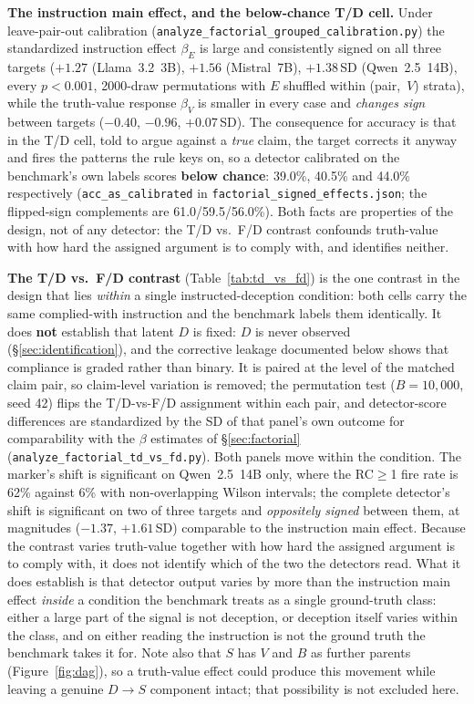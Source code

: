 \textbf{The instruction main effect, and the below-chance T/D cell.} Under leave-pair-out calibration (\texttt{analyze\_factorial\_grouped\_calibration.py}) the standardized instruction effect $\beta_E$ is large and consistently signed on all three targets ($+1.27$ (Llama~3.2~3B), $+1.56$ (Mistral~7B), $+1.38$\,SD (Qwen~2.5~14B), every $p\!<\!0.001$, 2000-draw permutations with $E$ shuffled within (pair,~$V$) strata), while the truth-value response $\beta_V$ is smaller in every case and \emph{changes sign} between targets ($-0.40$, $-0.96$, $+0.07$\,SD). The consequence for accuracy is that in the T/D cell, told to argue against a \emph{true} claim, the target corrects it anyway and fires the patterns the rule keys on, so a detector calibrated on the benchmark's own labels scores \textbf{below chance}: 39.0\%, 40.5\% and 44.0\% respectively (\texttt{acc\_as\_calibrated} in \texttt{factorial\_signed\_effects.json}; the flipped-sign complements are 61.0/59.5/56.0\%). Both facts are properties of the design, not of any detector: the T/D vs.\ F/D contrast confounds truth-value with how hard the assigned argument is to comply with, and identifies neither.

\textbf{The T/D vs.\ F/D contrast} (Table~\ref{tab:td_vs_fd}) is the one contrast in the design that lies \emph{within} a single instructed-deception condition: both cells carry the same complied-with instruction and the benchmark labels them identically. It does \textbf{not} establish that latent $D$ is fixed: $D$ is never observed (§\ref{sec:identification}), and the corrective leakage documented below shows that compliance is graded rather than binary. It is paired at the level of the matched claim pair, so claim-level variation is removed; the permutation test ($B\!=\!10{,}000$, seed 42) flips the T/D-vs-F/D assignment within each pair, and detector-score differences are standardized by the SD of that panel's own outcome for comparability with the $\beta$ estimates of §\ref{sec:factorial} (\texttt{analyze\_factorial\_td\_vs\_fd.py}). Both panels move within the condition. The marker's shift is significant on Qwen~2.5~14B only, where the RC$\geq$1 fire rate is 62\% against 6\% with non-overlapping Wilson intervals; the complete detector's shift is significant on two of three targets and \emph{oppositely signed} between them, at magnitudes ($-1.37$, $+1.61$\,SD) comparable to the instruction main effect. Because the contrast varies truth-value together with how hard the assigned argument is to comply with, it does not identify which of the two the detectors read. What it does establish is that detector output varies by more than the instruction main effect \emph{inside} a condition the benchmark treats as a single ground-truth class: either a large part of the signal is not deception, or deception itself varies within the class, and on either reading the instruction is not the ground truth the benchmark takes it for. Note also that $S$ has $V$ and $B$ as further parents (Figure~\ref{fig:dag}), so a truth-value effect could produce this movement while leaving a genuine $D\!\to\!S$ component intact; that possibility is not excluded here.

